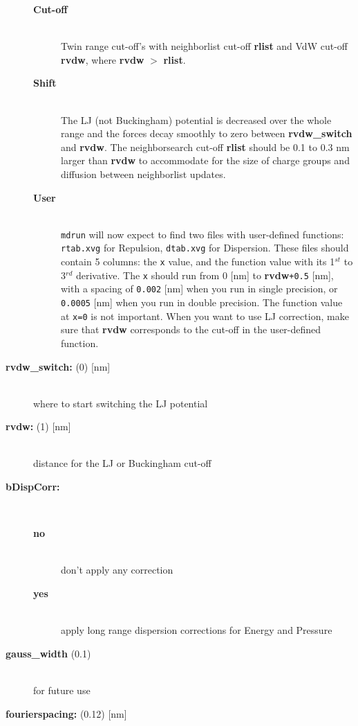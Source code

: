 \begin{description}
\begin{description}
\item[{\bf Cut-off}]\mbox{}\\
Twin range cut-off's with neighborlist cut-off {\bf rlist} and 
VdW cut-off {\bf rvdw},
where {\bf rvdw} {\tt $>$} {\bf rlist}.
\item[{\bf Shift}]\mbox{}\\
The LJ (not Buckingham)
potential is decreased over the whole range and the forces decay smoothly
to zero between {\bf rvdw\_switch} and {\bf rvdw}.
The neighborsearch cut-off {\bf rlist} should be 0.1 to 0.3 nm larger than
{\bf rvdw} to accommodate for the size of charge groups and diffusion
between neighborlist updates.
\item[{\bf User}]\mbox{}\\
{\tt mdrun} will now expect to find two files with user-defined
functions: {\tt rtab.xvg} for Repulsion, {\tt dtab.xvg} for Dispersion.
These files should contain 5 columns:
the {\tt x} value, and the function value with its 1$^{st}$
to 3$^{rd}$ derivative. The {\tt x} should run from 0 [nm] to
{\bf rvdw}{\tt +0.5} [nm], with a spacing of {\tt 0.002}
[nm] when you run in single precision, or {\tt 0.0005} [nm] when
you run in double precision. The function value at {\tt x=0} is not
important. When you want to use LJ correction, make sure that {\bf rvdw}
corresponds to the cut-off in the user-defined function.
\end{description}
\item[{\bf rvdw\_switch: }(0) {[nm]}]\mbox{}\\
where to start switching the LJ potential
\item[{\bf rvdw: }(1) {[nm]}]\mbox{}\\
distance for the LJ or Buckingham cut-off
\item[{\bf bDispCorr:}]\mbox{}\\
\vspace{-2ex}\begin{description}
\item[{\bf no}]\mbox{}\\
don't apply any correction
\item[{\bf yes}]\mbox{}\\
apply long range dispersion corrections for Energy and Pressure
\end{description}
\item[{\bf gauss\_width }(0.1)]\mbox{}\\
for future use
\item[{\bf fourierspacing: }(0.12) {[nm]}]\mbox{}\\

\end{description}
